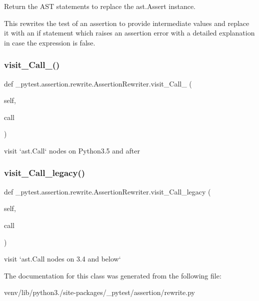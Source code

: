\begin{DoxyVerb}Return the AST statements to replace the ast.Assert instance.

This rewrites the test of an assertion to provide
intermediate values and replace it with an if statement which
raises an assertion error with a detailed explanation in case
the expression is false.\end{DoxyVerb}
 \mbox{\label{class__pytest_1_1assertion_1_1rewrite_1_1_assertion_rewriter_a7f0d51a7cfa01a996bbbfb91c1e0440b}} 
\subsubsection{\texorpdfstring{visit\+\_\+\+Call\+\_()}{visit\_Call\_35()}}
{\footnotesize\ttfamily def \+\_\+pytest.\+assertion.\+rewrite.\+Assertion\+Rewriter.\+visit\+\_\+\+Call\+\_ (\begin{DoxyParamCaption}\item[{}]{self,  }\item[{}]{call }\end{DoxyParamCaption})}

\begin{DoxyVerb}visit `ast.Call` nodes on Python3.5 and after
\end{DoxyVerb}
 \mbox{\label{class__pytest_1_1assertion_1_1rewrite_1_1_assertion_rewriter_a111e1e9e7559394c7e61e6d020cdca47}} 
\subsubsection{\texorpdfstring{visit\+\_\+\+Call\+\_\+legacy()}{visit\_Call\_legacy()}}
{\footnotesize\ttfamily def \+\_\+pytest.\+assertion.\+rewrite.\+Assertion\+Rewriter.\+visit\+\_\+\+Call\+\_\+legacy (\begin{DoxyParamCaption}\item[{}]{self,  }\item[{}]{call }\end{DoxyParamCaption})}

\begin{DoxyVerb}visit `ast.Call nodes on 3.4 and below`
\end{DoxyVerb}
 

The documentation for this class was generated from the following file\+:\begin{DoxyCompactItemize}
\item 
venv/lib/python3./site-\/packages/\+\_\+pytest/assertion/rewrite.\+py\end{DoxyCompactItemize}

